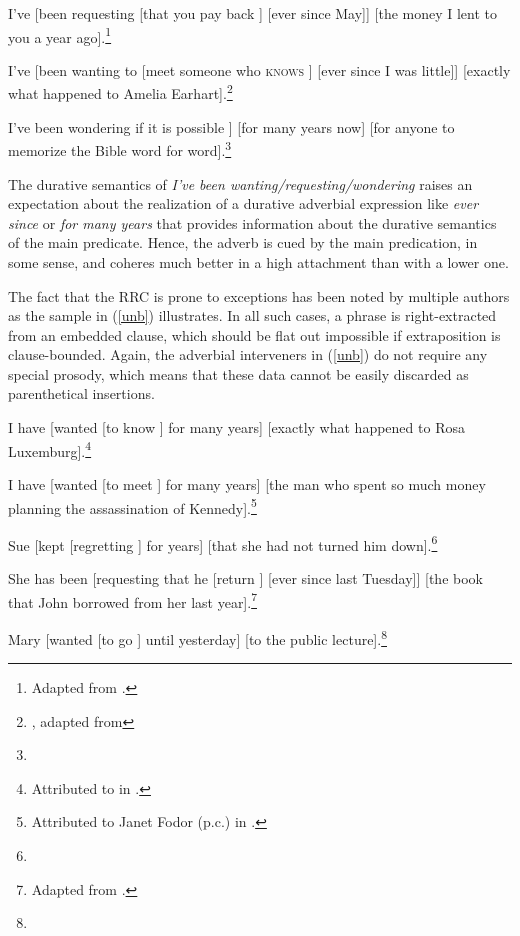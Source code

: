 \documentclass[output=paper
 	        ,biblatex
                ,babelshorthands
                ,newtxmath
                ,draftmode
                ,colorlinks, citecolor=brown
]{langscibook}
\begin{document}
\eal \label{longb}
\ex  I've [been requesting [that you pay back \spc] [ever since May]] [the money
I lent to you a year ago].\footnote{
  Adapted from .
}

\ex I've [been wanting to [meet someone who \textsc{knows} \spc] [ever since I was little]] [exactly what happened to Amelia
Earhart].\footnote{
  , adapted from 
}

\ex  I've been wondering  if it is possible   \spc]
[for many years now] [for anyone to memorize the Bible word for word].\footnote{
}
\zl


\noindent
The durative semantics of \emph{I've been wanting/requesting/wondering} raises an expectation about
the realization of a durative adverbial expression like \emph{ever since} or \emph{for many years}
that provides information about the durative semantics of the main predicate.  Hence, the adverb is
cued by the main predication, in some sense, and coheres much better in a high attachment than with
a lower one.

The fact that the RRC is prone to exceptions has been noted by multiple authors as the sample in
(\ref{unb}) illustrates. In all such cases, a phrase is right-extracted from an embedded clause,
which should be flat out impossible if extraposition is clause-bounded. Again, the adverbial
interveners in (\ref{unb}) do not require any special prosody, which means that these data cannot be
easily discarded as parenthetical insertions.
  
\eal \label{unb}
\ex I have  [wanted [to know \spc] for many years] [exactly what happened to Rosa Luxemburg].\footnote{
Attributed to  in .}

\ex I have  [wanted [to meet \spc] for many years] [the man who spent so much money planning the assassination of Kennedy].\footnote{
Attributed to Janet Fodor (p.c.) in .}

\ex Sue [kept [regretting \spc] for years] [that she had not turned
him down].\footnote{
}

\ex She has been [requesting that he [return \spc] [ever since last Tuesday]] [the book
that John borrowed from her last year].\footnote{
Adapted from .
}

\ex  Mary [wanted [to go \spc] until yesterday]  [to the public lecture].\footnote{}
\zl
\end{document}

